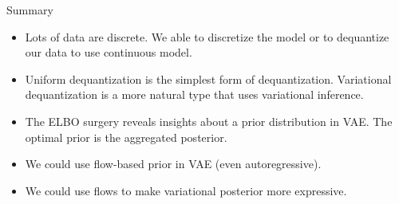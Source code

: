 \begin{frame}{Summary}
	\begin{itemize}
		\item Lots of data are discrete. We able to discretize the model or to dequantize our data to use continuous model.
		\vfill
		\item Uniform dequantization is the simplest form of dequantization. Variational dequantization is a more natural type that uses variational inference.
		\vfill
		\item The ELBO surgery reveals insights about a prior distribution in VAE. The optimal prior is the aggregated posterior.
		\vfill
		\item We could use flow-based prior in VAE (even autoregressive).
		\vfill
		\item We could use flows to make variational posterior more expressive. 
	\end{itemize}
\end{frame}

 